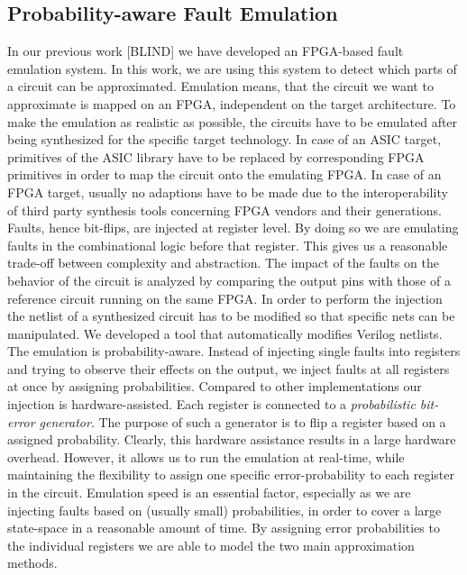 \documentclass[conference]{IEEEtran}
\begin{document}
\subsection{Probability-aware Fault Emulation}
In our previous work [BLIND] we have developed an FPGA-based fault emulation system. In this work, we are using this system to detect which parts of a circuit can be approximated. Emulation means, that the circuit we want to approximate is mapped on an FPGA, independent on the target architecture. To make the emulation as realistic as possible, the circuits have to be emulated after being synthesized for the specific target technology. In case of an ASIC target, primitives of the ASIC library have to be replaced by corresponding FPGA primitives in order to map the circuit onto the emulating FPGA. In case of an FPGA target, usually no adaptions have to be made due to the interoperability of third party synthesis tools concerning FPGA vendors and their generations. Faults, hence bit-flips, are injected at register level. By doing so we are emulating faults in the combinational logic before that register. This gives us a reasonable trade-off between complexity and abstraction. The impact of the faults on the behavior of the circuit is analyzed by comparing the output pins with those of a reference circuit running on the same FPGA. In order to perform the injection the netlist of a synthesized circuit has to be modified so that specific nets can be manipulated. We developed a tool that automatically modifies Verilog netlists. The emulation is probability-aware. Instead of injecting single faults into registers and trying to observe their effects on the output, we inject faults at all registers at once by assigning probabilities. Compared to other implementations our injection is hardware-assisted. Each register is connected to a \emph{probabilistic bit-error generator}. The purpose of such a generator is to flip a register based on a assigned probability. Clearly, this hardware assistance results in a large hardware overhead. However, it allows us to run the emulation at real-time, while maintaining the flexibility to assign one specific error-probability to each register in the circuit. Emulation speed is an essential factor, especially as we are injecting faults based on (usually small) probabilities, in order to cover a large state-space in a reasonable amount of time. By assigning error probabilities to the individual registers we are able to model the two main approximation methods.
\end{document}
